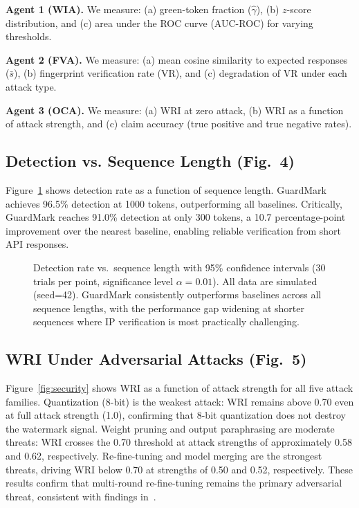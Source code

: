 \documentclass[journal,compsoc]{IEEEtran}
\begin{document}
\textbf{Agent 1 (WIA).} We measure: (a) green-token fraction ($\hat{\gamma}$),
(b) $z$-score distribution, and (c) area under the ROC curve (AUC-ROC) for
varying thresholds.

\textbf{Agent 2 (FVA).} We measure: (a) mean cosine similarity to expected
responses ($\bar{s}$), (b) fingerprint verification rate (VR), and (c)
degradation of VR under each attack type.

\textbf{Agent 3 (OCA).} We measure: (a) WRI at zero attack, (b) WRI as a
function of attack strength, and (c) claim accuracy (true positive and true
negative rates).

\subsection{Detection vs. Sequence Length (Fig.~4)}

Figure~\ref{fig:performance} shows detection rate as a function of sequence
length. GuardMark achieves 96.5\% detection at 1000 tokens, outperforming all
baselines. Critically, GuardMark reaches 91.0\% detection at only 300 tokens,
a 10.7 percentage-point improvement over the nearest baseline, enabling
reliable verification from short API responses.

\begin{figure}[t]
\caption{Detection rate vs.\ sequence length with 95\% confidence intervals
  (30 trials per point, significance level $\alpha=0.01$). All data are
  simulated (seed=42). GuardMark consistently outperforms baselines across
  all sequence lengths, with the performance gap widening at shorter sequences
  where IP verification is most practically challenging.}
\label{fig:performance}
\centering

\end{figure}

\subsection{WRI Under Adversarial Attacks (Fig.~5)}

Figure~\ref{fig:security} shows WRI as a function of attack strength for all
five attack families. Quantization (8-bit) is the weakest attack: WRI remains
above 0.70 even at full attack strength (1.0), confirming that 8-bit
quantization does not destroy the watermark signal. Weight pruning and output
paraphrasing are moderate threats: WRI crosses the 0.70 threshold at attack
strengths of approximately 0.58 and 0.62, respectively. Re-fine-tuning and
model merging are the strongest threats, driving WRI below 0.70 at strengths
of 0.50 and 0.52, respectively. These results confirm that multi-round
re-fine-tuning remains the primary adversarial threat, consistent with
findings in~\cite{qi2023fine}.
\end{document}
